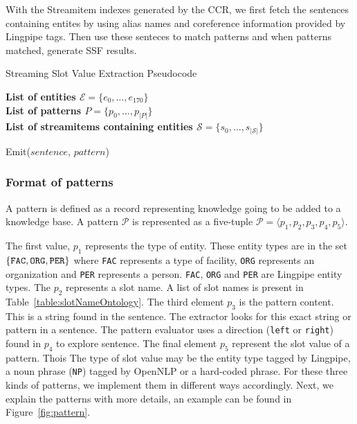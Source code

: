 With the Streamitem indexes generated by the CCR, we first fetch the sentences containing entites
by using alias names and coreference information provided by Lingpipe tags. Then use these senteces 
to match patterns and when patterns matched, generate SSF results.

\begin{algorithm}
  \caption{Streaming Slot Value Extraction Pseudocode}
  \textbf{List of entities $\mathcal{E} = \{e_0, \ldots, e_{170}\}$}\\
  \textbf{List of patterns $P = \{p_0, \ldots, p_{|P|}\}$}\\
  \textbf{List of streamitems containing entities $\mathcal{S} = \{s_0, \ldots, s_{|\mathcal{S}|}\}$}\\
  
  \begin{algorithmic}%
                \STATE Emit($sentence$, $pattern$)
              \ENDIF
	    \ENDFOR
          \ENDIF
        \ENDFOR
      \ENDFOR
    \ENDFOR
  \end{algorithmic}
\end{algorithm}


\subsubsection{Format of patterns}
A pattern is defined as a record representing knowledge going to be added to a knowledge base.
A pattern $\mathcal{P}$ is represented as a five-tuple $\mathcal{P} = \langle p_1, p_2, p_3, p_4, p_5 \rangle$.


The first value, $p_1$ represents the type of entity. These entity types are in
the set $\{ \text{\tt FAC}, \text{\tt ORG}, \text{\tt PER} \}$ where \texttt{FAC}
represents a type of facility, \texttt{ORG} represents an organization and \texttt{PER}
represents a person. \texttt{FAC}, \texttt{ORG} and \texttt{PER} are Lingpipe entity types.
The $p_2$ represents a slot name.
A list of slot names is present in Table~\ref{table:slotNameOntology}.
The third element $p_3$ is the pattern content. This is a string found in the sentence.
The extractor looks for this exact string or pattern in a sentence.
The pattern evaluator uses a direction (\texttt{left} or \texttt{right}) found in
$p_4$ to explore sentence.
The final element $p_5$ represent the slot value of a pattern. Thois
The type of slot value may be the entity 
type tagged by Lingpipe, a noun phrase (\texttt{NP}) tagged by OpenNLP or a hard-coded phrase. 
For these three kinds of patterns, we implement them in different 
ways accordingly. Next, we explain the patterns with more details, an
example can be found in Figure~\ref{fig:pattern}. 



